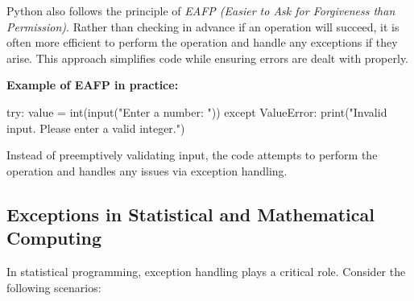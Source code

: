 \documentclass[
  letterpaper,
  DIV=11,
  numbers=noendperiod]{scrreprt}
\newenvironment{Shaded}{\begin{snugshade}}{\end{snugshade}}
\newcommand{\BuiltInTok}[1]{\textcolor[rgb]{0.00,0.23,0.31}{#1}}
\newcommand{\ControlFlowTok}[1]{\textcolor[rgb]{0.00,0.23,0.31}{#1}}
\newcommand{\NormalTok}[1]{\textcolor[rgb]{0.00,0.23,0.31}{#1}}
\newcommand{\OperatorTok}[1]{\textcolor[rgb]{0.37,0.37,0.37}{#1}}
\newcommand{\PreprocessorTok}[1]{\textcolor[rgb]{0.68,0.00,0.00}{#1}}
\newcommand{\StringTok}[1]{\textcolor[rgb]{0.13,0.47,0.30}{#1}}
\begin{document}
Python also follows the principle of \emph{EAFP (Easier to Ask for
Forgiveness than Permission)}. Rather than checking in advance if an
operation will succeed, it is often more efficient to perform the
operation and handle any exceptions if they arise. This approach
simplifies code while ensuring errors are dealt with properly.

\textbf{Example of EAFP in practice:}

\begin{Shaded}
\begin{Highlighting}[]
\ControlFlowTok{try}\NormalTok{:}
\NormalTok{    value }\OperatorTok{=} \BuiltInTok{int}\NormalTok{(}\BuiltInTok{input}\NormalTok{(}\StringTok{"Enter a number: "}\NormalTok{))}
\ControlFlowTok{except} \PreprocessorTok{ValueError}\NormalTok{:}
    \BuiltInTok{print}\NormalTok{(}\StringTok{"Invalid input. Please enter a valid integer."}\NormalTok{)}
\end{Highlighting}
\end{Shaded}

Instead of preemptively validating input, the code attempts to perform
the operation and handles any issues via exception handling.

\hypertarget{exceptions-in-statistical-and-mathematical-computing}{%
\subsection{Exceptions in Statistical and Mathematical
Computing}\label{exceptions-in-statistical-and-mathematical-computing}}

In statistical programming, exception handling plays a critical role.
Consider the following scenarios:
\end{document}
